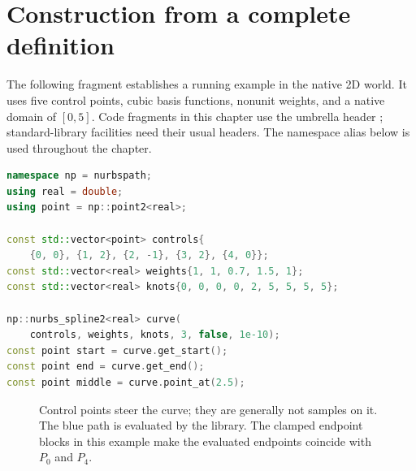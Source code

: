 \section{Construction from a complete definition}
\label{sec:spline-definition}

The following fragment establishes a running example in the native 2D world.
It uses five control points, cubic basis functions, nonunit weights, and a
native domain of $[0,5]$. Code fragments in this chapter use the umbrella header
; standard-library facilities need their usual
headers. The namespace alias  below is used throughout the chapter.

\begin{lstlisting}[language=C++,caption={A complete ordinary 2D curve definition.}]
namespace np = nurbspath;
using real = double;
using point = np::point2<real>;

const std::vector<point> controls{
    {0, 0}, {1, 2}, {2, -1}, {3, 2}, {4, 0}};
const std::vector<real> weights{1, 1, 0.7, 1.5, 1};
const std::vector<real> knots{0, 0, 0, 0, 2, 5, 5, 5, 5};

np::nurbs_spline2<real> curve(
    controls, weights, knots, 3, false, 1e-10);
const point start = curve.get_start();
const point end = curve.get_end();
const point middle = curve.point_at(2.5);
\end{lstlisting}

\begin{figure}[tbp]
\centering
{}
\caption{Control points steer the curve; they are generally not samples on
it. The blue path is evaluated by the library. The clamped endpoint blocks in
this example make the evaluated endpoints coincide with $P_0$ and $P_4$.}
\label{fig:spline-controls}
\end{figure}

